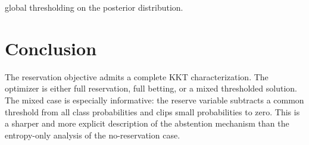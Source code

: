 global thresholding on the posterior distribution. \section{Conclusion} The reservation objective admits a complete KKT characterization. The optimizer is either full reservation, full betting, or a mixed thresholded solution. The mixed case is especially informative: the reserve variable subtracts a common threshold from all class probabilities and clips small probabilities to zero. This is a sharper and more explicit description of the abstention mechanism than the entropy-only analysis of the no-reservation case.



